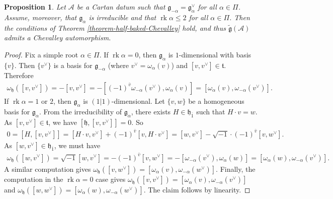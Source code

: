\documentclass[12pt, a4paper, reqno]{amsart}
\def\AA{\mathcal{A}}
\def\g{\mathfrak{g}}
\def\ol{\overline}
\def\rk{\operatorname{rk}}
\newtheorem{proposition}{Proposition}
\theoremstyle{definition}
\theoremstyle{definition}
\theoremstyle{definition}
\numberwithin{theorem}{section}
\numberwithin{lemma}{section}
\numberwithin{remark}{section}
\numberwithin{definition}{section}
\numberwithin{corollary}{section}
\numberwithin{proposition}{section}
\numberwithin{example}{section}
\begin{document}
	\begin{proposition}\label{proposition-rank-2-chevalley}
		Let \(\mathcal{A}\) be a Cartan datum such that \(\mathfrak{g}_{-\alpha} = \mathfrak{g}_{\alpha}^\vee\) for all \(\alpha \in \Pi\). Assume, moreover, that \(\mathfrak{g}_{\alpha}\) is irreducible and that \(\rk\alpha \leq 2\) for all \(\alpha \in \Pi\). Then the conditions of Theorem \ref{theorem-half-baked-Chevalley} hold, and thus $\tilde{\g}(\AA)$ admits a Chevalley automorphism.
	\end{proposition}
	
	\begin{proof}
		Fix a simple root \(\alpha \in \Pi\). If \(\rk\alpha = 0\), then \(\mathfrak{g}_{\alpha}\) is \(1\)-dimensional with basis \(\{v\}\). Then \(\{v^\vee\}\) is a basis for \(\mathfrak{g}_{-\alpha}\) (where \(v^\vee = \omega_{\alpha}(v)\)) and \([v,v^\vee] \in \mathfrak{t}\). Therefore
		\begin{align*}
			\omega_{\mathfrak{h}}([v,v^\vee]) = -[v,v^\vee] = - [(-1)^{\bar{v}}\omega_{-\alpha}(v^\vee),\omega_{\alpha}(v)] = [\omega_{\alpha}(v),\omega_{-\alpha}(v^\vee)].
		\end{align*}
		If \(\rk\alpha=1\) or $2$, then \(\mathfrak{g}_{\alpha}\) is \((1|1)\)-dimensional. Let \(\{v,w\}\) be a homogeneous basis for \(\mathfrak{g}_{\alpha}\). From the irreducibility of \(\mathfrak{g}_{\alpha}\), there exists \(H \in \mathfrak{h}_{\ol{1}}\) such that \(H\cdot v = w\). As \([v,v^\vee] \in \mathfrak{t}\), we have \([\mathfrak{h},[v,v^\vee]] = 0\). So
		\begin{align*}
			0 = [H,[v,v^\vee]] = [H\cdot v, v^\vee] + (-1)^{\bar{v}} [v,H\cdot v^\vee] = [w,v^\vee] - \sqrt{-1}\cdot (-1)^{\bar{v}}[v,w^\vee].
		\end{align*}
		As \([w,v^\vee] \in \mathfrak{h}_{\ol{1}}\), we must have
		\begin{align*}
			\omega_{\mathfrak{h}}([w,v^\vee]) = \sqrt{-1}[w,v^\vee] = -(-1)^{\bar{v}}[v,w^\vee] = - [\omega_{-\alpha}(v^\vee),\omega_{\alpha}(w)] = [\omega_{\alpha}(w),\omega_{-\alpha}(v^\vee)].
		\end{align*}
		A similar computation gives \(\omega_{\mathfrak{h}}([v,w^\vee]) = [\omega_{\alpha}(v),\omega_{-\alpha}(w^\vee)]\). Finally, the computation in the \(\rk\alpha = 0\) case gives \(\omega_{\mathfrak{h}}([v,v^\vee]) = [\omega_{\alpha}(v),\omega_{-\alpha}(v^\vee)] \)  
		and \(\omega_{\mathfrak{h}}([w,w^\vee]) = [\omega_{\alpha}(w),\omega_{-\alpha}(w^\vee)]\). The claim follows by linearity. 
	\end{proof}
	
\end{document}
